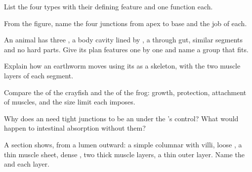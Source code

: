 \begin{exercise}[$\star$]\label{exo:b1:body-plans-tissues:3}
List the four  types with their defining feature and one
function each.
\end{exercise}

\begin{exercise}[$\star$]\label{exo:b1:body-plans-tissues:4}
From the  figure, name the four junctions from apex to base
and the job of each.
\end{exercise}

\begin{exercise}[$\star\star$]\label{exo:b1:body-plans-tissues:5}
An animal has three , a body cavity lined by , a
through gut, similar segments and no hard parts. Give its plan
features one by one and name a group that fits.
\end{exercise}

\begin{exercise}[$\star\star$]\label{exo:b1:body-plans-tissues:6}
Explain how an earthworm moves using its  as a skeleton, with
the two muscle layers of each segment.
\end{exercise}

\begin{exercise}[$\star\star$]\label{exo:b1:body-plans-tissues:7}
Compare the  of the crayfish and the  of the
frog: growth, protection, attachment of muscles, and the size limit each
imposes.
\end{exercise}

\begin{exercise}[$\star\star$]\label{exo:b1:body-plans-tissues:8}
Why does an  need tight junctions to be an 
under the 's control? What would happen to intestinal absorption
without them?
\end{exercise}

\begin{exercise}[$\star\star$]\label{exo:b1:body-plans-tissues:9}
A section shows, from a lumen outward: a simple columnar 
with villi, loose , a thin muscle sheet, dense
, two thick muscle layers, a thin outer layer. Name
the  and each layer.
\end{exercise}

